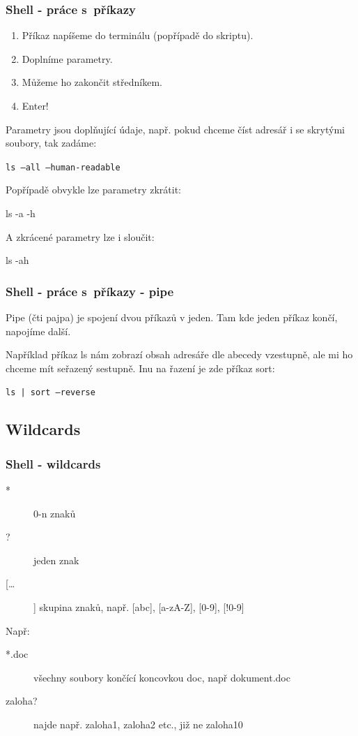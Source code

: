 \documentclass[xetex]{beamer}
\begin{document}
\begin{frame}
  \frametitle{Shell - práce s~příkazy}
  \begin{enumerate}
  \item Příkaz napíšeme do terminálu (popřípadě do skriptu). 
  \item Doplníme parametry.
  \item Můžeme ho zakončit středníkem. 
  \item Enter!
  \end{enumerate}
  
  Parametry jsou doplňující údaje, např. pokud chceme číst adresář i se skrytými soubory, tak zadáme:
  
  \texttt{ls --all --human-readable}
 
  Popřípadě obvykle lze parametry zkrátit:
  
  ls -a -h
  
  A zkrácené parametry lze i sloučit:
  
  ls -ah
\end{frame}	


\begin{frame}
  \frametitle{Shell - práce s~příkazy - pipe}
  Pipe (čti pajpa) je spojení dvou příkazů v jeden. Tam kde jeden příkaz končí, napojíme další.
  
  Například příkaz ls nám zobrazí obsah adresáře dle abecedy vzestupně, ale mi ho chceme mít seřazený sestupně. Inu na řazení je zde příkaz sort:
  
\texttt{ls | sort --reverse}
\end{frame}	

\subsection{Wildcards}
\begin{frame}
  \frametitle{Shell - wildcards}
  \begin{description}
  \item[*] 0-n znaků
  \item[?] jeden znak
  \item[[\ldots]] skupina znaků, např. [abc], [a-zA-Z], [0-9], [!0-9]
  \end{description} 
  Např: 
  \begin{description}
  \item[*.doc] všechny soubory končící koncovkou doc, např dokument.doc
  \item[zaloha?] najde např. zaloha1, zaloha2 etc., již ne zaloha10
  \end{description}
\end{frame}
\end{document}
